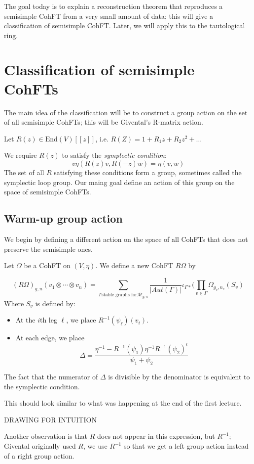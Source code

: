\documentclass{amsart}
\theoremstyle{definition}
\newcommand{\End}{\text{End}}
\newcommand{\Mbar}{\overline{\mathcal{M}}}
\newcommand{\Aut}{Aut}
\begin{document}
The goal today is to explain a reconstruction theorem that reproduces a semisimple CohFT from a very small amount of data; this will give a classification of semisimple CohFT.  Later, we will apply this to the tautological ring.

\section{Classification of semisimple CohFTs}

The main idea of the classification will be to construct a group action on the set of all semisimple CohFTs; this will be Givental's R-matrix action.

Let $R(z)\in\End(V)[[z]]$, i.e. $R(Z)=1+R_1z+R_2z^2+\dots$

We require $R(z)$ to satisfy the \emph{symplectic condition}:
$$
v\eta(R(z)v, R(-z)w)=\eta(v,w)$$
The set of all $R$ satisfying these conditions form a group, sometimes called the symplectic loop group.  Our maing goal define an action of this group on the space of semisimple CohFTs.


\subsection{Warm-up group action}
We begin by defining a different action on the space of all CohFTs that does not preserve the semisimple ones.

Let $\Omega$ be a CohFT on $(V,\eta)$.  We define a new CohFT $R\Omega$ by

$$(R\Omega)_{g,n}(v_1\otimes\cdots\otimes v_n)
=\sum_{\Gamma \text{stable graphs for} \Mbar_{g,n}} \frac{1}{|\Aut(\Gamma)|}
\iota_{\Gamma*}(\prod_{v\in\Gamma} \Omega_{g_v, n_v}( S_v)$$
Where $S_v$ is defined by:
\begin{itemize}
\item At the $i$th leg $\ell$, we place $R^{-1}(\psi_\ell)(v_i)$.
\item At each edge, we place $$\Delta=\frac{\eta^{-1}-R^{-1}(\psi_1)\eta^{-1}R^{-1}(\psi_2)^t}{\psi_1+\psi_2}$$
\end{itemize}

The fact that the numerator of $\Delta$ is divisible by the denominator is equivalent to the symplectic condition.

This should look similar to what was happening at the end of the first lecture.

DRAWING FOR INTUITION

Another observation is that $R$ does not appear in this expression, but $R^{-1}$; Givental originally used $R$, we use $R^{-1}$ so that we get a left group action instead of a right group action.
\end{document}
